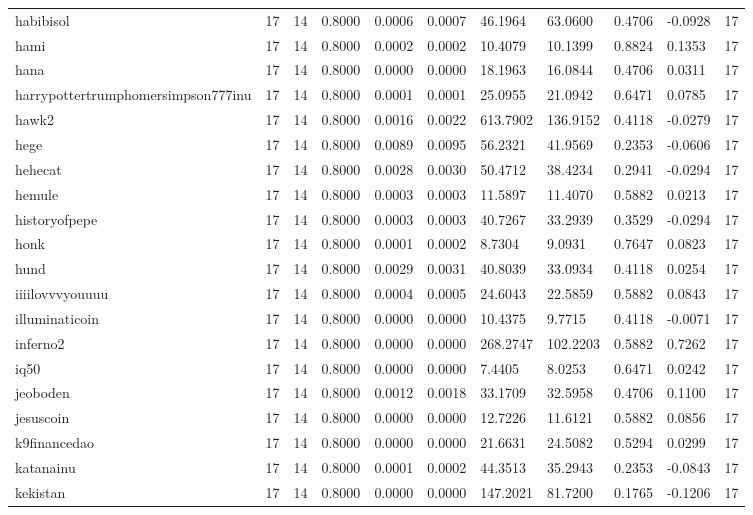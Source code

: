 \begin{table}[htbp]
\begin{tabular}{lllllllllll}
habibisol & 17 & 14 & 0.8000 & 0.0006 & 0.0007 & 46.1964 & 63.0600 & 0.4706 & -0.0928 & 17 \\
hami & 17 & 14 & 0.8000 & 0.0002 & 0.0002 & 10.4079 & 10.1399 & 0.8824 & 0.1353 & 17 \\
hana & 17 & 14 & 0.8000 & 0.0000 & 0.0000 & 18.1963 & 16.0844 & 0.4706 & 0.0311 & 17 \\
harrypottertrumphomersimpson777inu & 17 & 14 & 0.8000 & 0.0001 & 0.0001 & 25.0955 & 21.0942 & 0.6471 & 0.0785 & 17 \\
hawk2 & 17 & 14 & 0.8000 & 0.0016 & 0.0022 & 613.7902 & 136.9152 & 0.4118 & -0.0279 & 17 \\
hege & 17 & 14 & 0.8000 & 0.0089 & 0.0095 & 56.2321 & 41.9569 & 0.2353 & -0.0606 & 17 \\
hehecat & 17 & 14 & 0.8000 & 0.0028 & 0.0030 & 50.4712 & 38.4234 & 0.2941 & -0.0294 & 17 \\
hemule & 17 & 14 & 0.8000 & 0.0003 & 0.0003 & 11.5897 & 11.4070 & 0.5882 & 0.0213 & 17 \\
historyofpepe & 17 & 14 & 0.8000 & 0.0003 & 0.0003 & 40.7267 & 33.2939 & 0.3529 & -0.0294 & 17 \\
honk & 17 & 14 & 0.8000 & 0.0001 & 0.0002 & 8.7304 & 9.0931 & 0.7647 & 0.0823 & 17 \\
hund & 17 & 14 & 0.8000 & 0.0029 & 0.0031 & 40.8039 & 33.0934 & 0.4118 & 0.0254 & 17 \\
iiiilovvvyouuuu & 17 & 14 & 0.8000 & 0.0004 & 0.0005 & 24.6043 & 22.5859 & 0.5882 & 0.0843 & 17 \\
illuminaticoin & 17 & 14 & 0.8000 & 0.0000 & 0.0000 & 10.4375 & 9.7715 & 0.4118 & -0.0071 & 17 \\
inferno2 & 17 & 14 & 0.8000 & 0.0000 & 0.0000 & 268.2747 & 102.2203 & 0.5882 & 0.7262 & 17 \\
iq50 & 17 & 14 & 0.8000 & 0.0000 & 0.0000 & 7.4405 & 8.0253 & 0.6471 & 0.0242 & 17 \\
jeoboden & 17 & 14 & 0.8000 & 0.0012 & 0.0018 & 33.1709 & 32.5958 & 0.4706 & 0.1100 & 17 \\
jesuscoin & 17 & 14 & 0.8000 & 0.0000 & 0.0000 & 12.7226 & 11.6121 & 0.5882 & 0.0856 & 17 \\
k9financedao & 17 & 14 & 0.8000 & 0.0000 & 0.0000 & 21.6631 & 24.5082 & 0.5294 & 0.0299 & 17 \\
katanainu & 17 & 14 & 0.8000 & 0.0001 & 0.0002 & 44.3513 & 35.2943 & 0.2353 & -0.0843 & 17 \\
kekistan & 17 & 14 & 0.8000 & 0.0000 & 0.0000 & 147.2021 & 81.7200 & 0.1765 & -0.1206 & 17 \\

\end{tabular}
\end{table}
